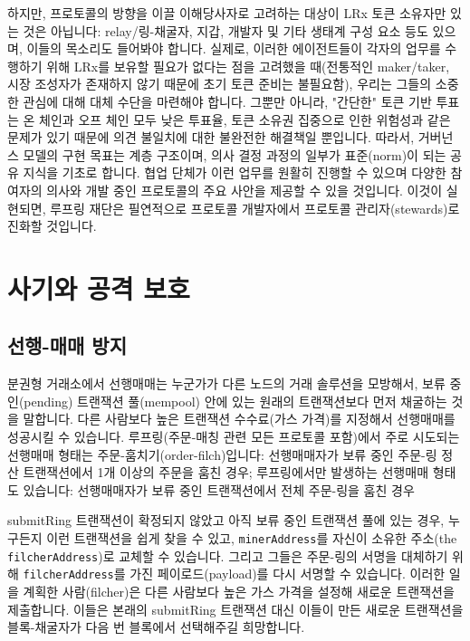 \documentclass[UTF8,nofonts]{article}
\begin{document}
\begin{multicols}{2}
하지만, 프로토콜의 방향을 이끌 이해당사자로 고려하는 대상이 LRx 토큰 소유자만 있는 것은 아닙니다: relay/링-채굴자, 지갑, 개발자 및 기타 생태계 구성 요소 등도 있으며, 이들의 목소리도 들어봐야 합니다. 실제로, 이러한 에이전트들이 각자의 업무를 수행하기 위해 LRx를 보유할 필요가 없다는 점을 고려했을 때(전통적인 maker/taker, 시장 조성자가 존재하지 않기 때문에 초기 토큰 준비는 불필요함), 우리는 그들의 소중한 관심에 대해 대체 수단을 마련해야 합니다. 그뿐만 아니라, "간단한" 토큰 기반 투표는 온 체인과 오프 체인 모두 낮은 투표율, 토큰 소유권 집중으로 인한 위험성과 같은 문제가 있기 때문에 의견 불일치에 대한 불완전한 해결책일 뿐입니다. 따라서, 거버넌스 모델의 구현 목표는 계층 구조이며, 의사 결정 과정의 일부가 표준(norm)이 되는 공유 지식을 기초로 합니다. 협업 단체가 이런 업무를 원활히 진행할 수 있으며 다양한 참여자의 의사와 개발 중인 프로토콜의 주요 사안을 제공할 수 있을 것입니다. 이것이 실현되면, 루프링 재단은 필연적으로 프로토콜 개발자에서 프로토콜 관리자(stewards)로 진화할 것입니다.    

\section{사기와 공격 보호}

\subsection{선행-매매 방지\label{sec:dual_authoring}}

분권형 거래소에서 선행매매는 누군가가 다른 노드의 거래 솔루션을 모방해서, 보류 중인(pending) 트랜잭션 풀(mempool) 안에 있는 원래의 트랜잭션보다 먼저 채굴하는 것을 말합니다. 다른 사람보다 높은 트랜잭션 수수료(가스 가격)를 지정해서 선행매매를 성공시킬 수 있습니다. 루프링(주문-매칭 관련 모든 프로토콜 포함)에서 주로 시도되는 선행매매 형태는 주문-훔치기(order-filch)입니다: 선행매매자가 보류 중인 주문-링 정산 트랜잭션에서 1개 이상의 주문을 훔친 경우; 루프링에서만 발생하는 선행매매 형태도 있습니다: 선행매매자가 보류 중인 트랜잭션에서 전체 주문-링을 훔친 경우

submitRing 트랜잭션이 확정되지 않았고 아직 보류 중인 트랜잭션 풀에 있는 경우, 누구든지 이런 트랜잭션을 쉽게 찾을 수 있고, \verb|minerAddress|를 자신이 소유한 주소(the \verb|filcherAddress|)로 교체할 수 있습니다. 그리고 그들은 주문-링의 서명을 대체하기 위해 \verb|filcherAddress|를 가진 페이로드(payload)를 다시 서명할 수 있습니다. 이러한 일을 계획한 사람(filcher)은 다른 사람보다 높은 가스 가격을 설정해 새로운 트랜잭션을 제출합니다. 이들은 본래의 submitRing 트랜잭션 대신 이들이 만든 새로운 트랜잭션을 블록-채굴자가 다음 번 블록에서 선택해주길 희망합니다.


\end{multicols}
\end{document}
